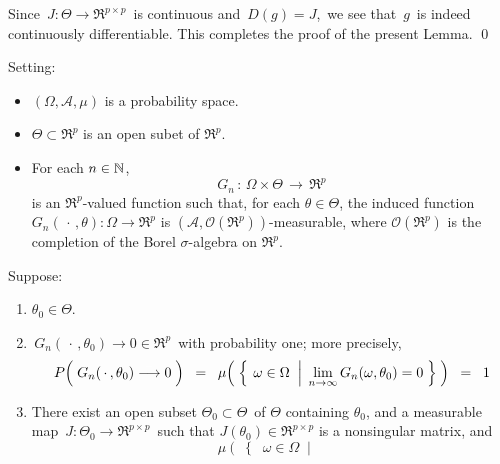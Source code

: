 \vskip 0.5cm
\noindent
Since \,$J : \Theta \longrightarrow \Re^{p \times p}$\, is continuous and \,$D(g) = J$,\,
we see that \,$g$\, is indeed continuously differentiable.
This completes the proof of the present Lemma.
\qed


\vskip 0.5cm
\begin{lemma}
\mbox{}\vskip 0.1cm
\noindent
Setting:
\begin{itemize}
\item
	$(\Omega,\mathcal{A},\mu)$ is a probability space.
\item
	$\Theta \subset \Re^{p}$ is an open subet of $\Re^{p}$.
\item
	For each $n \in \mathbb{N}$,
	\begin{equation*}
	G_{n} \, : \, \Omega \times \Theta \, \longrightarrow \, \Re^{p}
	\end{equation*}
	is an $\Re^{p}$-valued function such that, for each $\theta \in \Theta$,
	the induced function $G_{n}(\,\cdot\,,\theta) : \Omega \longrightarrow \Re^{p}$
	is $(\mathcal{A},\mathcal{O}(\Re^{p}))$-measurable, where
	$\mathcal{O}(\Re^{p})$ is the completion of
	the Borel $\sigma$-algebra on $\Re^{p}$.
\end{itemize}
\renewcommand{\theenumi}{\alph{enumi}}
\renewcommand{\labelenumi}{\textnormal{(\theenumi)}$\;\;$}
Suppose:
\begin{enumerate}
\item
	$\theta_{0} \in \Theta$.
\item
	\,$G_{n}(\,\cdot\,,\theta_{0}) \longrightarrow 0\in\Re^{p}$\, with probability one; more precisely,
	\begin{equation*}
	P\!\left(\;
		G_{n}(\,\cdot\,,\theta_{0}) \overset{{\color{white}-}}{\longrightarrow} 0
		\;\right)
	\;\; = \;\;
		\mu\!\left(\;\left\{\;
			\left.
			\omega \overset{{\color{white}.}}{\in} \Omega
			\;\;\right\vert\;
			\underset{n\rightarrow\infty}{\lim}\,G_{n}(\omega,\theta_{0}) = 0
			\;\right\}\;\right)
	\;\; = \;\;
		1
	\end{equation*}
\item
	There exist an open subset \;$\Theta_{0} \subset \Theta$\, of \;$\Theta$ containing $\theta_{0}$,
	and a measurable map
	\,$J : \Theta_{0} \longrightarrow \Re^{p \times p}$\,
	such that $J(\theta_{0}) \in \Re^{p \times p}$ is a nonsingular matrix, and
	\begin{equation*}
	\mu\!\left(\;\left\{\;\;
		\omega \in \Omega
		\;\;\left\vert\;
		\begin{array}{c}

\end{array}
\end{equation*}
\end{enumerate}
\end{lemma}
